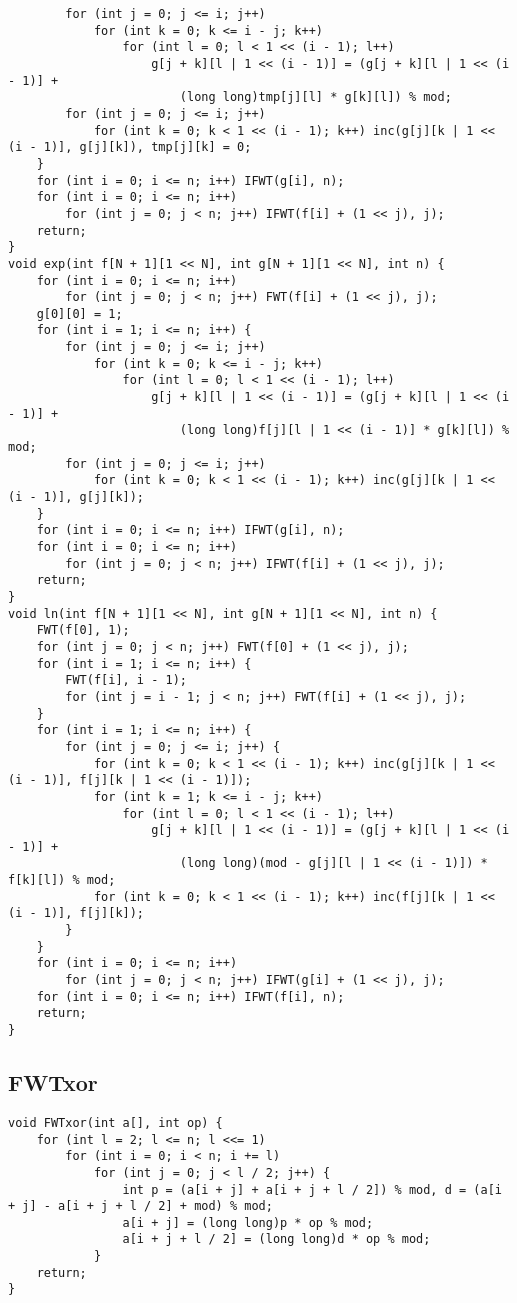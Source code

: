 \begin{verbatim}
        for (int j = 0; j <= i; j++)
            for (int k = 0; k <= i - j; k++)
                for (int l = 0; l < 1 << (i - 1); l++)
                    g[j + k][l | 1 << (i - 1)] = (g[j + k][l | 1 << (i - 1)] +
                        (long long)tmp[j][l] * g[k][l]) % mod;
        for (int j = 0; j <= i; j++)
            for (int k = 0; k < 1 << (i - 1); k++) inc(g[j][k | 1 << (i - 1)], g[j][k]), tmp[j][k] = 0;
    }
    for (int i = 0; i <= n; i++) IFWT(g[i], n);
    for (int i = 0; i <= n; i++)
        for (int j = 0; j < n; j++) IFWT(f[i] + (1 << j), j);
    return;
}
void exp(int f[N + 1][1 << N], int g[N + 1][1 << N], int n) {
    for (int i = 0; i <= n; i++)
        for (int j = 0; j < n; j++) FWT(f[i] + (1 << j), j);
    g[0][0] = 1;
    for (int i = 1; i <= n; i++) {
        for (int j = 0; j <= i; j++)
            for (int k = 0; k <= i - j; k++)
                for (int l = 0; l < 1 << (i - 1); l++)
                    g[j + k][l | 1 << (i - 1)] = (g[j + k][l | 1 << (i - 1)] +
                        (long long)f[j][l | 1 << (i - 1)] * g[k][l]) % mod;
        for (int j = 0; j <= i; j++)
            for (int k = 0; k < 1 << (i - 1); k++) inc(g[j][k | 1 << (i - 1)], g[j][k]);
    }
    for (int i = 0; i <= n; i++) IFWT(g[i], n);
    for (int i = 0; i <= n; i++)
        for (int j = 0; j < n; j++) IFWT(f[i] + (1 << j), j);
    return;
}
void ln(int f[N + 1][1 << N], int g[N + 1][1 << N], int n) {
    FWT(f[0], 1);
    for (int j = 0; j < n; j++) FWT(f[0] + (1 << j), j);
    for (int i = 1; i <= n; i++) {
        FWT(f[i], i - 1);
        for (int j = i - 1; j < n; j++) FWT(f[i] + (1 << j), j);
    }
    for (int i = 1; i <= n; i++) {
        for (int j = 0; j <= i; j++) {
            for (int k = 0; k < 1 << (i - 1); k++) inc(g[j][k | 1 << (i - 1)], f[j][k | 1 << (i - 1)]);
            for (int k = 1; k <= i - j; k++)
                for (int l = 0; l < 1 << (i - 1); l++)
                    g[j + k][l | 1 << (i - 1)] = (g[j + k][l | 1 << (i - 1)] +
                        (long long)(mod - g[j][l | 1 << (i - 1)]) * f[k][l]) % mod;
            for (int k = 0; k < 1 << (i - 1); k++) inc(f[j][k | 1 << (i - 1)], f[j][k]);
        }
    }
    for (int i = 0; i <= n; i++)
        for (int j = 0; j < n; j++) IFWT(g[i] + (1 << j), j);
    for (int i = 0; i <= n; i++) IFWT(f[i], n);
    return;
}
\end{verbatim}

\subsection{FWTxor}

\begin{verbatim}
void FWTxor(int a[], int op) {
    for (int l = 2; l <= n; l <<= 1)
        for (int i = 0; i < n; i += l)
            for (int j = 0; j < l / 2; j++) {
                int p = (a[i + j] + a[i + j + l / 2]) % mod, d = (a[i + j] - a[i + j + l / 2] + mod) % mod;
                a[i + j] = (long long)p * op % mod;
                a[i + j + l / 2] = (long long)d * op % mod;
            }
    return;
}
\end{verbatim}